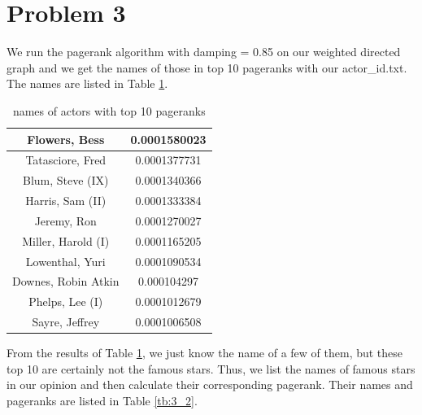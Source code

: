 \documentclass{article}
\begin{document}
\section{Problem 3}
We run the pagerank algorithm with damping = 0.85 on our weighted directed graph and we get the names of those in top 10 pageranks with our actor\_id.txt. The names are listed in Table \ref{tb:3_1}.\\

\begin {table}[htbp]
\caption{names of actors with top 10 pageranks}
\begin{adjustbox}{center}
\label{tb:3_1}
\begin{tabular}{|c|c|}
\hline
Flowers, Bess & 0.0001580023\\
\hline
Tatasciore, Fred & 0.0001377731 \\
\hline
Blum, Steve (IX) & 0.0001340366 \\
\hline
Harris, Sam (II) & 0.0001333384 \\
\hline
Jeremy, Ron & 0.0001270027 \\
\hline
Miller, Harold (I) & 0.0001165205 \\
\hline
Lowenthal, Yuri & 0.0001090534 \\
\hline
Downes, Robin Atkin & 0.000104297  \\
\hline
Phelps, Lee (I) & 0.0001012679  \\
\hline
Sayre, Jeffrey & 0.0001006508  \\
\hline
\end{tabular}
\end{adjustbox}
\end{table}

\noindent From the results of Table \ref{tb:3_1}, we just know the name of a few of them, but these top 10  are certainly not the famous stars. Thus, we list the names of famous stars in our opinion and then calculate their corresponding pagerank. Their names and pageranks are listed in Table \ref{tb:3_2}.\\
\end{document}

